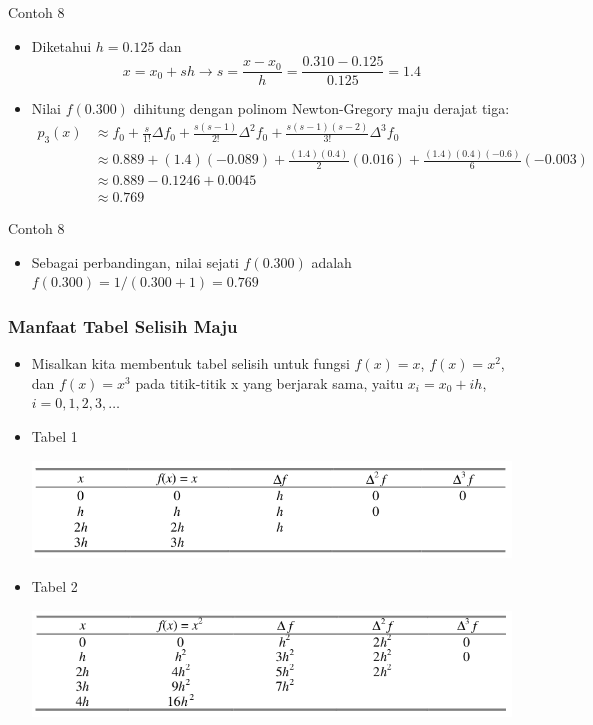 \documentclass[pdflatex,compress,mathserif]{beamer}
\begin{document}
\begin{frame}{Contoh 8}
	\begin{itemize}
		\item Diketahui $ h = 0.125 $ dan
		\[ x = x_0 + sh \rightarrow s = \frac{x - x_0}{h} = \frac{0.310 - 0.125}{0.125} = 1.4 \]
		\item Nilai $ f(0.300) $ dihitung dengan polinom Newton-Gregory maju derajat tiga:
		\begin{align*}
			p_3(x) &\approx f_0 + \frac{s}{1!} \Delta f_0 + \frac{s(s-1)}{2!}\Delta^2 f_0 + \frac{s(s-1)(s-2)}{3!}\Delta^3 f_0 \\
			& \approx 0.889 + (1.4)(-0.089) + \frac{(1.4)(0.4)}{2}(0.016) + \frac{(1.4)(0.4)(-0.6)}{6}(-0.003) \\
			&\approx 0.889 - 0.1246 + 0.0045 \\
			&\approx 0.769
		\end{align*}
	\end{itemize}
\end{frame}

\begin{frame}{Contoh 8}
	\begin{itemize}
		\item Sebagai perbandingan, nilai sejati $ f(0.300) $ adalah $ f(0.300) = 1/(0.300+1) = 0.769 $
	\end{itemize}
\end{frame}

\begin{frame}
	\frametitle{Manfaat Tabel Selisih Maju}
	\begin{itemize}
		\item Misalkan kita membentuk tabel selisih untuk fungsi $ f(x) = x $, $ f(x) = x^2 $, dan $ f(x) = x^3 $ pada titik-titik x yang berjarak sama, yaitu $ x_i = x_0 + ih $, $ i = 0, 1, 2, 3, \dots $
		\item Tabel 1
		\begin{center}
			\includegraphics[width=0.7\linewidth]{img/img21}
		\end{center}
		\item Tabel 2
		\begin{center}
			\includegraphics[width=0.7\linewidth]{img/img22}
		\end{center}
	\end{itemize}
\end{frame}
\end{document}
